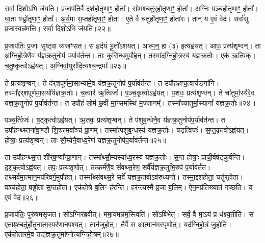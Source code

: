 सर्वा॒ दिशो॒ऽभि ज॑यति।
प्र॒जा\-प॑ति॒र्वै दश॑होतृणा॒ꣳ॒ होता᳚।
सोम॒श्चतु॑र्‌\mbox{}होतृणा॒ꣳ॒ होता᳚।
अ॒ग्निः पञ्च॑होतृणा॒ꣳ॒ होता᳚।
धा॒ता षड्ढो॑तृणा॒ꣳ॒ होता᳚।
अ॒र्य॒मा स॒प्तहो॑तृणा॒ꣳ॒ होता᳚।
ए॒ते वै चतु॑र्\mbox{}होतृणा॒ꣳ॒ होता॑रः।
तान् य ए॒वं वेद॑।
सर्वा॑सु प्र॒जास्वन्न॑मत्ति।
सर्वा॒ दिशो॒ऽभि ज॑यति॥२२॥\anuvakamend[आ॒र्ध्नु॒व॒न्ना॒र्ध्नु॒व॒न्नित्ये॒वं वेदा᳚त्ति सर्वा॒ दिशो॒ऽभि ज॑यति (वै तेन॑ स॒त्रङ्केन॑॥)]

प्र॒जा\-प॑तिः प्र॒जाः सृ॒ष्ट्वा व्य॑स्रꣳसत।
स हृद॑यं भू॒तो॑\-ऽशयत्।
आत्म॒न्॒ हा (३) इत्यह्व॑यत्।
आपः॒ प्रत्य॑शृण्वन्।
ता अ॑ग्निहो॒त्रेणै॒व य॑ज्ञक्र॒तुनोप॑ प॒र्याव॑र्तन्त।
ताः कुसि॑न्ध॒मुपौ॑हन्।
तस्मा॑दग्निहो॒त्रस्य॑ यज्ञक्र॒तोः।
एक॑ ऋ॒त्विक्।
च॒तु॒ष्कृत्वो\-ऽह्व॑यत्।
अ॒ग्निर्वा॒युरा॑दि॒त्यश्च॒न्द्रमाः᳚॥२३॥

ते प्रत्य॑शृण्वन्।
ते द॑र्‌\mbox{}शपूर्णमा॒साभ्या॑मे॒व य॑ज्ञक्र॒तुनोप॑ प॒र्या\-व॑र्तन्त।
त उपौ॑हꣴश्च॒त्वार्यङ्गा॑नि।
तस्मा᳚द्दर्‌\mbox{}शपूर्ण\-मा॒सयो᳚र्यज्ञक्र॒तोः।
च॒त्वार॑ ऋ॒त्विजः॑।
प॒ञ्च॒कृत्वो\-ऽह्व॑यत्।
प॒शवः॒ प्रत्य॑\-शृण्वन्।
ते चा॑तुर्मा॒स्यैरे॒व य॑ज्ञक्र॒तुनोप॑ प॒र्याव॑र्तन्त।
त उपौ॑हं॒ लोम॑ छ॒वीं मा॒ꣳ॒समस्थि॑ म॒ज्जानम्᳚।
तस्मा᳚च्चातुर्मा॒स्यानां᳚ यज्ञक्र॒तोः॥२४॥

पञ्च॒र्त्विजः॑।
ष॒ट्कृत्वो\-ऽह्व॑यत्।
ऋ॒तवः॒ प्रत्य॑शृण्वन्।
ते प॑शुब॒न्धेनै॒व य॑ज्ञक्र॒तुनोप॑प॒र्याव॑र्तन्त।
त उपौ॑ह॒न्थ्स्तना॑वा॒ण्डौ शि॒श्ञमवा᳚ञ्चं प्रा॒णम्।
तस्मा᳚त्पशुब॒न्धस्य॑ यज्ञक्र॒तोः।
षडृ॒त्विजः॑।
स॒प्त॒कृत्वो\-ऽह्व॑यत्।
होत्राः॒ प्रत्य॑शृण्वन्।
ताः सौ॒म्येनै॒वाध्व॒रेण॑ यज्ञक्र॒तुनोप॑प॒र्याव॑र्तन्त॥२५॥

ता उपौ॑हन्थ्स॒प्त शी॑र्‌\mbox{}ष॒ण्या᳚न्प्रा॒णान्।
तस्मा᳚थ्सौ॒म्यस्या᳚ध्व॒रस्य॑ यज्ञक्र॒तोः।
स॒प्त होत्राः॒ प्राची॒र्वष॑ट्कुर्वन्ति।
द॒श॒कृत्वो\-ऽह्व॑यत्।
तपः॒ प्रत्य॑शृणोत्।
तत्कर्म॑णै॒व सं॑वथ्स॒रेण॒ सर्वै᳚र्यज्ञक्र॒तुभि॒रुप॑ प॒र्याव॑र्तत।
तथ्सर्व॑मा॒त्मान॒मप॑रिवर्ग॒मुपौ॑हत्।
तस्मा᳚थ्संवथ्स॒रे सर्वे॑ यज्ञक्र॒तवो\-ऽव॑रुध्यन्ते।
तस्मा॒द्दश॑होता॒ चतु॑र्‌\mbox{}होता।
पञ्च॑होता॒ षड्ढो॑ता स॒प्तहो॑ता।
एक॑होत्रे ब॒लिꣳ ह॑रन्ति।
हर॑न्त्यस्मै प्र॒जा ब॒लिम्।
ऐन॒मप्र॑तिख्यातं गच्छति।
य ए॒वं वेद॑॥२६॥\anuvakamend[च॒न्द्रमा᳚श्चातुर्मा॒स्यानां᳚ यज्ञक्र॒तोर॑ध्व॒रेण॑ यज्ञक्र॒तुनोप॑ प॒र्याव॑र्तन्त स॒प्तहो॑ता च॒त्वारि॑ च]

प्र॒जा\-प॑तिः॒ पुरु॑षम\-सृजत।
सो᳚ऽग्निर॑ब्रवीत्।
ममा॒यमन्न॑\-म॒स्त्विति॑।
सो॑ऽबिभेत्।
सर्वं॒ वै मा॒ऽयं प्र ध॑क्ष्य॒तीति॑।
स ए॒ताꣴ\-श्चतु॑र्\mbox{}होतॄनात्म॒स्पर॑णानपश्यत्।
तान॑जुहोत्।
तैर्वै स आ॒त्मान॑\-मस्पृणोत्।
यद॑ग्निहो॒त्रं जु॒होति॑।
एक॑होतारमे॒व तद्य॑ज्ञ\-क्र॒तुमा᳚प्नोत्यग्नि\-हो॒त्रम्॥२७॥

